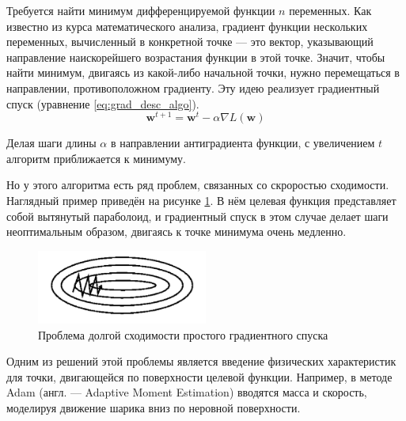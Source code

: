 Требуется найти минимум дифференцируемой функции $n$ переменных. Как известно из курса математического анализа, градиент функции нескольких переменных, вычисленный в конкретной точке --- это вектор, указывающий направление наискорейшего возрастания функции в этой точке. Значит, чтобы найти минимум, двигаясь из какой-либо начальной точки, нужно перемещаться в направлении, противоположном градиенту. Эту идею реализует градиентный спуск (уравнение \ref*{eq:grad_desc_algo}).
\begin{equation}
    \label{eq:grad_desc_algo}
    \mathbf{w}^{t+1}=\mathbf{w}^t-\alpha\nabla L(\mathbf{w})
\end{equation}

Делая шаги длины $\alpha$ в направлении антиградиента функции, с увеличением $t$ алгоритм приближается к минимуму.

Но у этого алгоритма есть ряд проблем, связанных со скроростью сходимости. Наглядный пример приведён на рисунке \ref*{fig:grad_desc_problem}. В нём целевая функция представляет собой вытянутый параболоид, и градиентный спуск в этом случае делает шаги неоптимальным образом, двигаясь к точке минимума очень медленно.

\begin{figure}
    \centering
    \includegraphics[width=0.5\textwidth]{../inc/images/gradient_descend_problem.png}
    \caption{Проблема долгой сходимости простого градиентного спуска}
    \label{fig:grad_desc_problem}
\end{figure}

Одним из решений этой проблемы является введение физических характеристик для точки, двигающейся по поверхности целевой функции. Например, в методе Adam (англ. --- Adaptive Moment Estimation) вводятся масса и скорость, моделируя движение шарика вниз по неровной поверхности.

